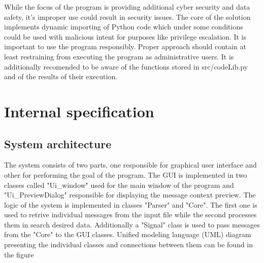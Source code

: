 \documentclass[a4paper,twoside,12pt]{book}
\begin{document}
While the focus of the program is providing additional cyber security and data safety, it's 
improper use could result in security issues. The core of the solution implements
dynamic importing of Python code which under some conditions could be used with malicious
intent for purposes like privilege escalation. It is important to use the program 
responsibly. Proper approach should contain at least restraining from executing
the program as administrative users. It is additionally recomended to be aware of the 
functions stored in src/codeLib.py and of the results of their execution. 

\chapter{Internal specification}



\section{System architecture}

The system consists of two parts, one responsible for graphical user interface and other for
performing the goal of the program. The GUI is implemented in two classes called "Ui\_window" used for the main window of the program and "Ui\_PreviewDialog" responsible for displaying 
the message context preview. The logic of the system is implemented in classes "Parser" and "Core". The first one is used to retrive individual messages from the input file while the second
processes them in search desired data. Additionally a "Signal" class is used to pass messages from the "Core" to the GUI classes. Unified modeling language (UML) diagram presenting the individual classes and connections between them can be found in the figure %
\end{document}
